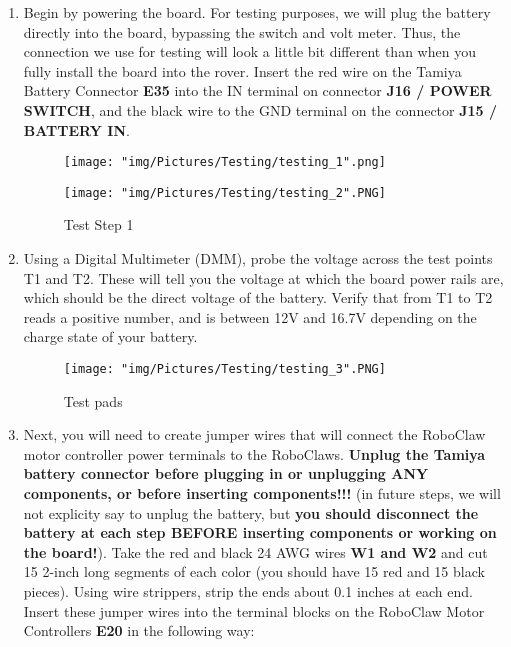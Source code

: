 \documentclass{article}
\begin{document}
\begin{enumerate}

\item Begin by powering the board. For testing purposes, we will plug the battery directly into the board, bypassing the switch and volt meter.  Thus, the connection we use for testing will look a little bit different than when you fully install the board into the rover. Insert the red wire on the Tamiya Battery Connector \textbf{E35} into the IN terminal on connector \textbf{J16 / POWER SWITCH}, and the black wire to the GND terminal on the connector \textbf{J15 / BATTERY IN}.

\begin{figure}[H]
  \centering
  \begin{minipage}[b]{0.45\textwidth}
    \texttt{[image: "img/Pictures/Testing/testing\_1".png]}
  \end{minipage}
  \hfill
  \begin{minipage}[b]{0.45\textwidth}
    \texttt{[image: "img/Pictures/Testing/testing\_2".PNG]}
  \end{minipage}
  \caption{Test Step 1}
  \label{test_1}
\end{figure}

\item Using a Digital Multimeter (DMM), probe the voltage across the test points T1 and T2. These will tell you the voltage at which the board power rails are, which should be the direct voltage of the battery. Verify that from T1 to T2 reads a positive number, and is between 12V and 16.7V depending on the charge state of your battery. 

\begin{figure}[H]
  \centering
    \texttt{[image: "img/Pictures/Testing/testing\_3".PNG]}
  \caption{Test pads}
  \label{test_pads_1}
\end{figure}

\item Next, you will need to create jumper wires that will connect the RoboClaw motor controller power terminals to the RoboClaws. \textbf{Unplug the Tamiya battery connector before plugging in or unplugging ANY components, or before inserting components!!!}  (in future steps, we will not explicity say to unplug the battery, but \textbf{you should disconnect the battery at each step BEFORE inserting components or working on the board!}). Take the red and black 24 AWG wires \textbf{W1 and W2} and cut 15 2-inch long segments of each color (you should have 15 red and 15 black pieces). Using wire strippers, strip the ends about 0.1 inches at each end. Insert these jumper wires into the terminal blocks on the RoboClaw Motor Controllers \textbf{E20} in the following way:


\end{enumerate}
\end{document}
